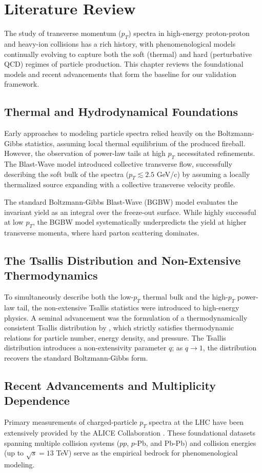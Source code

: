 \chapter{Literature Review}
\label{ch:literature_review}

The study of transverse momentum ($p_T$) spectra in high-energy proton-proton and heavy-ion collisions has a rich history, with phenomenological models continually evolving to capture both the soft (thermal) and hard (perturbative QCD) regimes of particle production. This chapter reviews the foundational models and recent advancements that form the baseline for our validation framework.

\section{Thermal and Hydrodynamical Foundations}
Early approaches to modeling particle spectra relied heavily on the Boltzmann-Gibbs statistics, assuming local thermal equilibrium of the produced fireball. However, the observation of power-law tails at high $p_T$ necessitated refinements. The Blast-Wave model \citep{Schnedermann1993} introduced collective transverse flow, successfully describing the soft bulk of the spectra ($p_T \lesssim 2.5$ GeV/c) by assuming a locally thermalized source expanding with a collective transverse velocity profile. 

The standard Boltzmann-Gibbs Blast-Wave (BGBW) model evaluates the invariant yield as an integral over the freeze-out surface. While highly successful at low $p_T$, the BGBW model systematically underpredicts the yield at higher transverse momenta, where hard parton scattering dominates.

\section{The Tsallis Distribution and Non-Extensive Thermodynamics}
To simultaneously describe both the low-$p_T$ thermal bulk and the high-$p_T$ power-law tail, the non-extensive Tsallis statistics were introduced to high-energy physics. A seminal advancement was the formulation of a thermodynamically consistent Tsallis distribution by \citet{Cleymans2012}, which strictly satisfies thermodynamic relations for particle number, energy density, and pressure. The Tsallis distribution introduces a non-extensivity parameter $q$; as $q \to 1$, the distribution recovers the standard Boltzmann-Gibbs form.

\section{Recent Advancements and Multiplicity Dependence}
Primary measurements of charged-particle $p_T$ spectra at the LHC have been extensively provided by the ALICE Collaboration \citep{ALICE2018}. These foundational datasets spanning multiple collision systems ($pp$, $p$-Pb, and Pb-Pb) and collision energies (up to $\sqrt{s} = 13$ TeV) serve as the empirical bedrock for phenomenological modeling.

